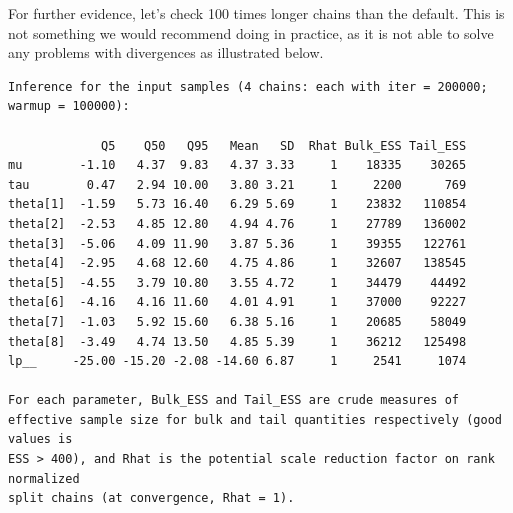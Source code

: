 \documentclass[american,]{article}
\begin{document}
For further evidence, let's check 100 times longer chains than the
default. This is not something we would recommend doing in practice, as
it is not able to solve any problems with divergences as illustrated
below.

\begin{verbatim}
Inference for the input samples (4 chains: each with iter = 200000; warmup = 100000):

             Q5    Q50   Q95   Mean   SD  Rhat Bulk_ESS Tail_ESS
mu        -1.10   4.37  9.83   4.37 3.33     1    18335    30265
tau        0.47   2.94 10.00   3.80 3.21     1     2200      769
theta[1]  -1.59   5.73 16.40   6.29 5.69     1    23832   110854
theta[2]  -2.53   4.85 12.80   4.94 4.76     1    27789   136002
theta[3]  -5.06   4.09 11.90   3.87 5.36     1    39355   122761
theta[4]  -2.95   4.68 12.60   4.75 4.86     1    32607   138545
theta[5]  -4.55   3.79 10.80   3.55 4.72     1    34479    44492
theta[6]  -4.16   4.16 11.60   4.01 4.91     1    37000    92227
theta[7]  -1.03   5.92 15.60   6.38 5.16     1    20685    58049
theta[8]  -3.49   4.74 13.50   4.85 5.39     1    36212   125498
lp__     -25.00 -15.20 -2.08 -14.60 6.87     1     2541     1074

For each parameter, Bulk_ESS and Tail_ESS are crude measures of 
effective sample size for bulk and tail quantities respectively (good values is 
ESS > 400), and Rhat is the potential scale reduction factor on rank normalized
split chains (at convergence, Rhat = 1).
\end{verbatim}
\end{document}
